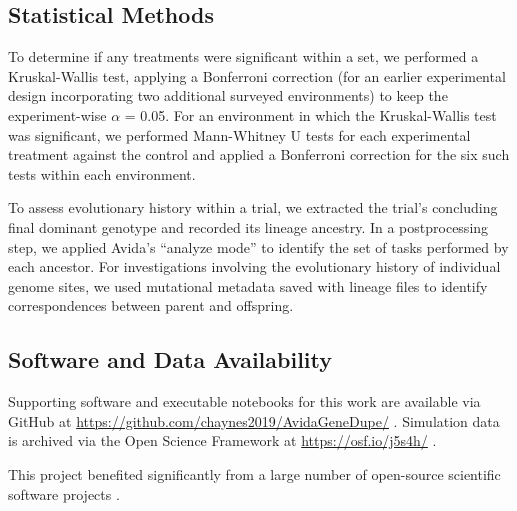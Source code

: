 \subsection{Statistical Methods}

To determine if any treatments were significant within a set, we performed a Kruskal-Wallis test, applying a Bonferroni correction (for an earlier experimental design incorporating two additional surveyed environments) to keep the experiment-wise $\alpha$ = 0.05.
For an environment in which the Kruskal-Wallis test was significant, we performed Mann-Whitney U tests for each experimental treatment against the control and applied a Bonferroni correction for the six such tests within each environment.

To assess evolutionary history within a trial, we extracted the trial's concluding final dominant genotype and recorded its lineage ancestry.
In a postprocessing step, we applied Avida's ``analyze mode'' to identify the set of tasks performed by each ancestor.
For investigations involving the evolutionary history of individual genome sites, we used mutational metadata saved with lineage files to identify correspondences between parent and offspring.

\subsection{Software and Data Availability} \label{sec:materials}

Supporting software and executable notebooks for this work are available via GitHub at \url{https://github.com/chaynes2019/AvidaGeneDupe/} \citep{david_m_bryson_2025_14911296}.
Simulation data is archived via the Open Science Framework at \url{https://osf.io/j5s4h/} \citep{foster2017open}.

This project benefited significantly from a large number of open-source scientific software projects \citep{2020SciPy-NMeth,harris2020array,reback2020pandas,mckinney-proc-scipy-2010,waskom2021seaborn,hunter2007matplotlib,moreno2023teeplot,r_core_team_r:_2015}.
